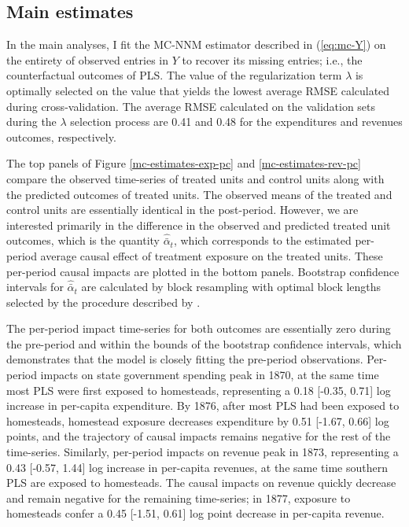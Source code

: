 \documentclass[hidelinks,12pt]{article}
\begin{document}
\subsection{Main estimates} \label{main-estimates}

In the main analyses, I fit the MC-NNM estimator described in (\ref{eq:mc-Y}) on the entirety of observed entries in $Y$ to recover its missing entries; i.e., the counterfactual outcomes of PLS. The value of the regularization term $\lambda$ is optimally selected on the value that yields the lowest average RMSE calculated during cross-validation. The average RMSE calculated on the validation sets during the $\lambda$ selection process are 0.41 and 0.48 for the expenditures and revenues outcomes, respectively. 

The top panels of Figure \ref{mc-estimates-exp-pc} and \ref{mc-estimates-rev-pc} compare the observed time-series of treated units and control units along with the predicted outcomes of treated units. The observed means of the treated and control units are essentially identical in the post-period. However, we are interested primarily in the difference in the observed and predicted treated unit outcomes, which is the quantity $\hat{\bar{\alpha}}_{t}$, which corresponds to the estimated per-period average causal effect of treatment exposure on the treated units. These per-period causal impacts are plotted in the bottom panels. Bootstrap confidence intervals for $\hat{\bar{\alpha}}_{t}$ are calculated by block resampling with optimal block lengths selected by the procedure described by \citet{politis2004automatic}. 

The per-period impact time-series for both outcomes are essentially zero during the pre-period and within the bounds of the bootstrap confidence intervals, which demonstrates that the model is closely fitting the pre-period observations. Per-period impacts on state government spending peak in 1870, at the same time most PLS were first exposed to homesteads, representing a 0.18 [-0.35, 0.71] log increase in per-capita expenditure. By 1876, after most PLS had been exposed to homesteads, homestead exposure decreases expenditure by 0.51 [-1.67, 0.66] log points, and the trajectory of causal impacts remains negative for the rest of the time-series. Similarly, per-period impacts on revenue peak in 1873, representing a 0.43 [-0.57, 1.44] log increase in per-capita revenues, at the same time southern PLS are exposed to homesteads. The causal impacts on revenue quickly decrease and remain negative for the remaining time-series; in 1877, exposure to homesteads confer a 0.45 [-1.51, 0.61] log point decrease in per-capita revenue. 
\end{document}
